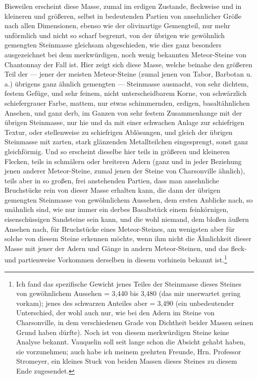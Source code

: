 \documentclass[a4paper, 11pt, oneside, german]{article}
\begin{document}
Bisweilen erscheint diese Masse, zumal im erdigen Zustande, fleckweise und in kleineren und größeren, selbst in bedeutenden Partien von ansehnlicher Größe nach allen Dimensionen, ebenso wie der olivinartige Gemengteil, nur mehr unförmlich und nicht so scharf begrenzt, von der übrigen wie gewöhnlich gemengten Steinmasse gleichsam abgeschieden, wie dies ganz besonders ausgezeichnet bei dem merkwürdigen, noch wenig bekannten Meteor-Steine von Chantonnay der Fall ist. Hier zeigt sich diese Masse, welche beinahe den größeren Teil der --- jener der meisten Meteor-Steine (zumal jenen von Tabor, Barbotan u. a.) übrigens ganz ähnlich gemengten --- Steinmasse ausmacht, von sehr dichtem, festem Gefüge, und sehr feinem, nicht unterscheidbarem Korne, von schwärzlich schiefergrauer Farbe, mattem, nur etwas schimmernden, erdigen, basaltähnlichen Ansehen, und ganz derb, im Ganzen von sehr festem Zusammenhange mit der übrigen Steinmasse, nur hie und da mit einer schwachen Anlage zur schiefrigen Textur, oder stellenweise zu schiefrigen Ablösungen, und gleich der übrigen Steinmasse mit zarten, stark glänzenden Metallteilchen eingesprengt, sonst ganz gleichförmig. Und so erscheint dieselbe hier teils in größeren und kleineren Flecken, teils in schmälern oder breiteren Adern (ganz und in jeder Beziehung jenen anderer Meteor-Steine, zumal jenen der Steine von Charsonville ähnlich), teils aber in so großen, frei anstehenden Partien, dass man ansehnliche Bruchstücke rein von dieser Masse erhalten kann, die dann der übrigen gemengten Steinmasse von gewöhnlichem Aussehen, dem ersten Anblicke nach, so unähnlich sind, wie nur immer ein derbes Basaltstück einem feinkörnigen, eisenschüssigen Sandsteine sein kann, und die wohl niemand, dem bloßen äußern Ansehen nach, für Bruchstücke eines Meteor-Steines, am wenigsten aber für solche von diesem Steine erkennen möchte, wenn ihm nicht die Ähnlichkeit dieser Masse mit jener der Adern und Gänge in andern Meteor-Steinen, und das fleck- und partienweise Vorkommen derselben in diesem vorhinein bekannt ist.\footnote{Ich fand das spezifische Gewicht jenes Teiles der Steinmasse dieses Steines von gewöhnlichem Aussehen = 3,440 bis 3,480 (das mir unerwartet gering vorkam); jenes des schwarzen Anteiles aber = 3,490 (ein unbedeutender Unterschied, der wohl auch nur, wie bei den Adern im Steine von Charsonville, in dem verschiedenen Grade von Dichtheit beider Massen seinen Grund haben dürfte). Noch ist von diesem merkwürdigen Steine keine Analyse bekannt. Vauquelin soll seit lange schon die Absicht gehabt haben, sie vorzunehmen; auch habe ich meinem geehrten Freunde, Hrn. Professor Stromeyer, ein kleines Stuck von beiden Massen dieses Steines zu diesem Ende zugesendet.}
\end{document}
